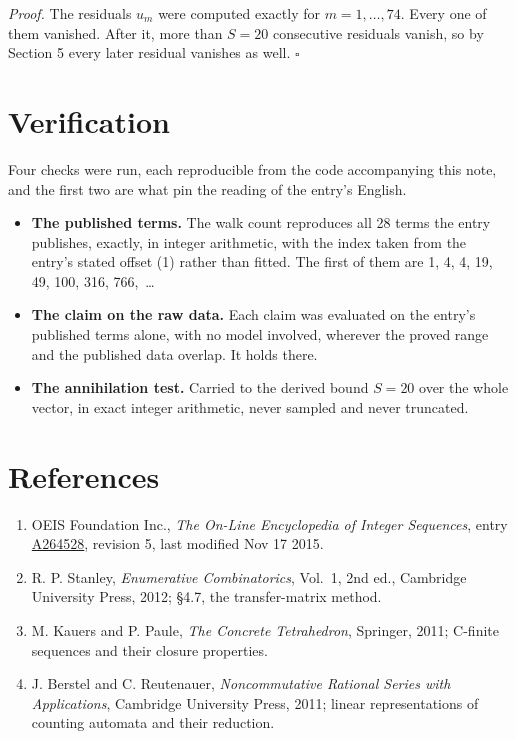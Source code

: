 \documentclass[11pt]{article}
\theoremstyle{definition}
\begin{document}
{\itshape Proof.} The residuals $u_m$ were computed exactly for $m = 1,\dots,74$. Every one of them vanished. After it, more than $S = 20$ consecutive residuals vanish, so by Section 5 every later residual vanishes as well. $\square$

\section{Verification}

Four checks were run, each reproducible from the code accompanying this note, and the first two are what pin the reading of the entry's English.

\begin{itemize}

\item {\bfseries The published terms.} The walk count reproduces all 28 terms the entry publishes, exactly, in integer arithmetic, with the index taken from the entry's stated offset (1) rather than fitted. The first of them are 1, 4, 4, 19, 49, 100, 316, 766,~\dots

\item {\bfseries The claim on the raw data.} Each claim was evaluated on the entry's published terms alone, with no model involved, wherever the proved range and the published data overlap. It holds there.

\item {\bfseries The annihilation test.} Carried to the derived bound $S = 20$ over the whole vector, in exact integer arithmetic, never sampled and never truncated.

\end{itemize}

\section{References}

\begin{enumerate}

\item OEIS Foundation Inc., \emph{The On-Line Encyclopedia of Integer Sequences}, entry \href{https://oeis.org/A264528}{A264528}, revision 5, last modified Nov 17 2015.

\item R. P. Stanley, \emph{Enumerative Combinatorics}, Vol.~1, 2nd ed., Cambridge University Press, 2012; \S4.7, the transfer-matrix method.

\item M. Kauers and P. Paule, \emph{The Concrete Tetrahedron}, Springer, 2011; C-finite sequences and their closure properties.

\item J. Berstel and C. Reutenauer, \emph{Noncommutative Rational Series with Applications}, Cambridge University Press, 2011; linear representations of counting automata and their reduction.

\end{enumerate}
\end{document}
